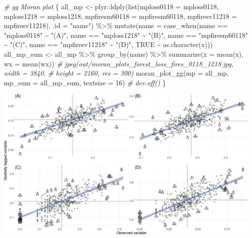\documentclass[10pt,landscape,a3paper]{article}
\newenvironment{Shaded}{\begin{snugshade}}{\end{snugshade}}
\newcommand{\AttributeTok}[1]{\textcolor[rgb]{0.77,0.63,0.00}{#1}}
\newcommand{\CommentTok}[1]{\textcolor[rgb]{0.56,0.35,0.01}{\textit{#1}}}
\newcommand{\ConstantTok}[1]{\textcolor[rgb]{0.00,0.00,0.00}{#1}}
\newcommand{\DecValTok}[1]{\textcolor[rgb]{0.00,0.00,0.81}{#1}}
\newcommand{\FunctionTok}[1]{\textcolor[rgb]{0.00,0.00,0.00}{#1}}
\newcommand{\NormalTok}[1]{#1}
\newcommand{\OtherTok}[1]{\textcolor[rgb]{0.56,0.35,0.01}{#1}}
\newcommand{\SpecialCharTok}[1]{\textcolor[rgb]{0.00,0.00,0.00}{#1}}
\newcommand{\StringTok}[1]{\textcolor[rgb]{0.31,0.60,0.02}{#1}}
\begin{document}
\begin{Shaded}
\begin{Highlighting}[]

\CommentTok{\# gg Moran plot}
\NormalTok{\{}
\NormalTok{    all\_mp }\OtherTok{\textless{}{-}}\NormalTok{ plyr}\SpecialCharTok{::}\FunctionTok{ldply}\NormalTok{(}\FunctionTok{list}\NormalTok{(}\AttributeTok{mploss0118 =}\NormalTok{ mploss0118, }\AttributeTok{mploss1218 =}\NormalTok{ mploss1218,}
        \AttributeTok{mpfiresm60118 =}\NormalTok{ mpfiresm60118, }\AttributeTok{mpfiresv11218 =}\NormalTok{ mpfiresv11218), }\AttributeTok{.id =} \StringTok{"name"}\NormalTok{) }\SpecialCharTok{\%\textgreater{}\%}
        \FunctionTok{mutate}\NormalTok{(}\AttributeTok{name =} \FunctionTok{case\_when}\NormalTok{(name }\SpecialCharTok{==} \StringTok{"mploss0118"} \SpecialCharTok{\textasciitilde{}} \StringTok{"(A)"}\NormalTok{, name }\SpecialCharTok{==} \StringTok{"mploss1218"} \SpecialCharTok{\textasciitilde{}}
            \StringTok{"(B)"}\NormalTok{, name }\SpecialCharTok{==} \StringTok{"mpfiresm60118"} \SpecialCharTok{\textasciitilde{}} \StringTok{"(C)"}\NormalTok{, name }\SpecialCharTok{==} \StringTok{"mpfiresv11218"} \SpecialCharTok{\textasciitilde{}} \StringTok{"(D)"}\NormalTok{,}
            \ConstantTok{TRUE} \SpecialCharTok{\textasciitilde{}} \FunctionTok{as.character}\NormalTok{(x)))}
\NormalTok{    all\_mp\_sum }\OtherTok{\textless{}{-}}\NormalTok{ all\_mp }\SpecialCharTok{\%\textgreater{}\%}
        \FunctionTok{group\_by}\NormalTok{(name) }\SpecialCharTok{\%\textgreater{}\%}
        \FunctionTok{summarize}\NormalTok{(}\AttributeTok{x =} \FunctionTok{mean}\NormalTok{(x), }\AttributeTok{wx =} \FunctionTok{mean}\NormalTok{(wx))}
    \CommentTok{\# jpeg(\textquotesingle{}out/moran\_plots\_forest\_loss\_fires\_0118\_1218.jpg\textquotesingle{}, width = 3840,}
    \CommentTok{\# height = 2160, res = 300)}
    \FunctionTok{moran\_plot\_gg}\NormalTok{(}\AttributeTok{mp =}\NormalTok{ all\_mp, }\AttributeTok{mp\_sum =}\NormalTok{ all\_mp\_sum, }\AttributeTok{textsize =} \DecValTok{16}\NormalTok{)}
    \CommentTok{\# dev.off()}
\NormalTok{\}}
\end{Highlighting}
\end{Shaded}

\begin{center}\includegraphics{img/modelling/lta-esda-6} \end{center}
\end{document}

